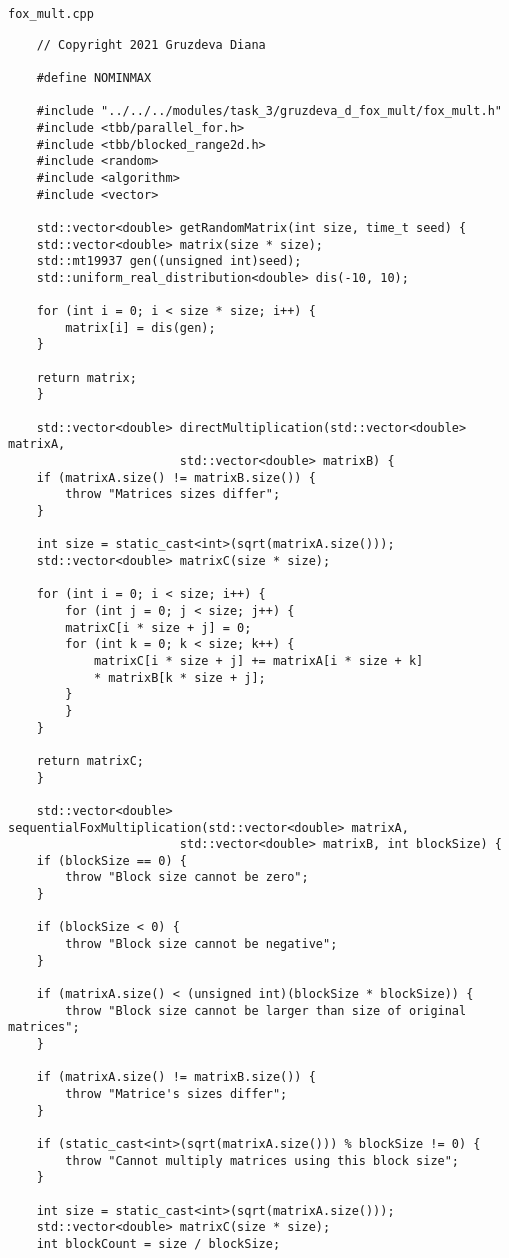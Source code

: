 \documentclass{article}
\begin{document}
\par
\lstinline$fox_mult.cpp$
\begin{lstlisting}
	// Copyright 2021 Gruzdeva Diana

	#define NOMINMAX

	#include "../../../modules/task_3/gruzdeva_d_fox_mult/fox_mult.h"
	#include <tbb/parallel_for.h>
	#include <tbb/blocked_range2d.h>
	#include <random>
	#include <algorithm>
	#include <vector>

	std::vector<double> getRandomMatrix(int size, time_t seed) {
  	std::vector<double> matrix(size * size);
  	std::mt19937 gen((unsigned int)seed);
  	std::uniform_real_distribution<double> dis(-10, 10);

  	for (int i = 0; i < size * size; i++) {
    	matrix[i] = dis(gen);
  	}

  	return matrix;
	}

	std::vector<double> directMultiplication(std::vector<double> matrixA,
    	                std::vector<double> matrixB) {
  	if (matrixA.size() != matrixB.size()) {
    	throw "Matrices sizes differ";
  	}

  	int size = static_cast<int>(sqrt(matrixA.size()));
  	std::vector<double> matrixC(size * size);

  	for (int i = 0; i < size; i++) {
    	for (int j = 0; j < size; j++) {
      	matrixC[i * size + j] = 0;
      	for (int k = 0; k < size; k++) {
        	matrixC[i * size + j] += matrixA[i * size + k]
        	* matrixB[k * size + j];
      	}
    	}
  	}

  	return matrixC;
	}

	std::vector<double> sequentialFoxMultiplication(std::vector<double> matrixA,
    	                std::vector<double> matrixB, int blockSize) {
  	if (blockSize == 0) {
    	throw "Block size cannot be zero";
  	}

  	if (blockSize < 0) {
    	throw "Block size cannot be negative";
  	}

  	if (matrixA.size() < (unsigned int)(blockSize * blockSize)) {
    	throw "Block size cannot be larger than size of original matrices";
  	}

  	if (matrixA.size() != matrixB.size()) {
    	throw "Matrice's sizes differ";
  	}

  	if (static_cast<int>(sqrt(matrixA.size())) % blockSize != 0) {
    	throw "Cannot multiply matrices using this block size";
  	}

  	int size = static_cast<int>(sqrt(matrixA.size()));
  	std::vector<double> matrixC(size * size);
  	int blockCount = size / blockSize;


\end{lstlisting}
\end{document}
